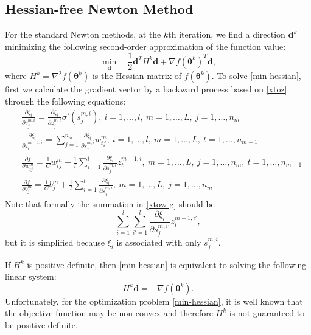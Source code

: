 \documentclass[12pt]{article}
\def\bd{{\boldsymbol d}}
\def\btheta{\boldsymbol \theta}
\begin{document}
\subsection{Hessian-free Newton Method}
\label{subsec:Hessian-free}
For the standard Newton methods, at the $k$th iteration, we find a direction $\bd^k$ 
minimizing the following second-order approximation of the function value:
\begin{equation}
\label{min-hessian}
\min_{\bd}\quad \frac{1}{2} \bd^T H^k \bd + \nabla f(\btheta^k)^T\bd,
\end{equation}
where $H^k = \nabla^2 f(\btheta^k)$ is the Hessian matrix of $f(\btheta^k)$.
To solve \eqref{min-hessian}, first we calculate the gradient vector by a backward process based on \eqref{xtoz} through the following equations:
\begin{align}
&\frac{\partial \xi_i}{\partial s^{m,i}_j} = \frac{\partial \xi_i}{\partial z^{m,i}_j} \sigma' (s^{m,i}_j),\ i=1,\ldots,l,\ m=1,\ldots,L,\ j=1,\ldots,n_m\label{ztox-g}\\
&\frac{\partial \xi_i}{\partial z^{m-1,i}_t} = \sum_{j=1}^{n_m} \frac{\partial \xi_i}{\partial s^{m,i}_j}w^m_{tj},\ i=1,\ldots,l,\ m=1,\ldots,L,\ t=1,\ldots,n_{m-1}\label{communi-g}\\
&\frac{\partial f}{\partial w^m_{tj}}= \frac{1}{C} w^m_{tj} + \frac{1}{l} \sum_{i=1}^l \frac{\partial \xi_i}{\partial s^{m,i}_j} z^{m-1,i}_t,\ m=1,\ldots,L,\ j=1,\ldots,n_m,\ t=1,\ldots,n_{m-1} \label{xtow-g}\\
&\frac{\partial f}{\partial b^m_{j}} = \frac{1}{C} b^m_{j} + \frac{1}{l} \sum_{i=1}^l \frac{\partial \xi_i}{\partial s^{m,i}_j},\ m=1,\ldots,L,\ j=1,\ldots,n_m. \label{xtow-g-bias}
\end{align}
Note that formally the summation in \eqref{xtow-g} should be
\begin{equation*}
\sum_{i=1}^l \sum_{i'=1}^l \frac{\partial \xi_i}{\partial s_j^{m,i'}} z_t^{m-1,i'},
\end{equation*}
but it is simplified because $\xi_i$ is associated with only $s_j^{m,i}$.
\par If $H^k$ is positive definite, then \eqref{min-hessian} is equivalent to solving the following linear system:
\begin{equation}
\label{full-newton-noLM}
H^k  \bd = - \nabla f(\btheta^k).
\end{equation}
Unfortunately, for the optimization problem \eqref{min-hessian}, it is well known that the objective function may be non-convex and therefore
$H^k$ is not guaranteed to be positive definite.
\end{document}
